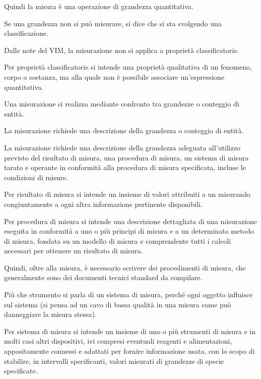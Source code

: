 Quindi la misura è una operazione di grandezza quantitativa. \newline 

Se una grandezza non si può misurare, si dice che si sta svolgendo una classificazione. \newline 

Dalle note del VIM, la misurazione non si applica a proprietà classificatorie. \newline 

Per proprietà classificatorie si intende una proprietà qualitativa di un fenomeno, corpo o sostanza, ma alla quale non è possibile associare un'espressione quantitativa. \newline 

Una misurazione si realizza mediante confronto tra grandezze o conteggio di entità. \newline 

La misurazione richiede una descrizione della grandezza o conteggio di entità. \newline 

La misurazione richiede una descrizione della grandezza adeguata all'utilizzo previsto del risultato di misura, 
una procedura di misura, un sistema di misura tarato e operante in conformità alla procedura di misura 
specificata, incluse le condizioni di misure. \newline 

Per risultato di misura si intende un insieme di valori attribuiti a un misurando congiuntamente a ogni altra informazione pertinente disponibili. \newline 

Per procedura di misura si intende una descrizione dettagliata di una misurazione eseguita in conformità a uno o più principi 
di misura e a un determinato metodo di misura, fondata su un modello di misura e comprendente tutti i calcoli necessari per ottenere un risultato di misura. \newline 

Quindi, oltre alla misura, è necessario scrivere dei procedimenti di misura, che generalmente sono dei documenti tecnici standard da compilare. \newline 

Più che strumento si parla di un sistema di misura, perché ogni oggetto influisce sul sistema (si pensa ad un cavo di bassa qualità in una misura come può danneggiare la misura stessa). \newline 

Per sistema di misura si intende un insieme di uno o più strumenti di misura e in molti casi altri dispositivi, 
ivi compresi eventuali reagenti e alimentazioni, appositamente connessi e adattati per fornire informazione 
usata, con lo scopo di stabilire, in intervalli specificanti, valori misurati di grandezze di specie specificate. \newline 

